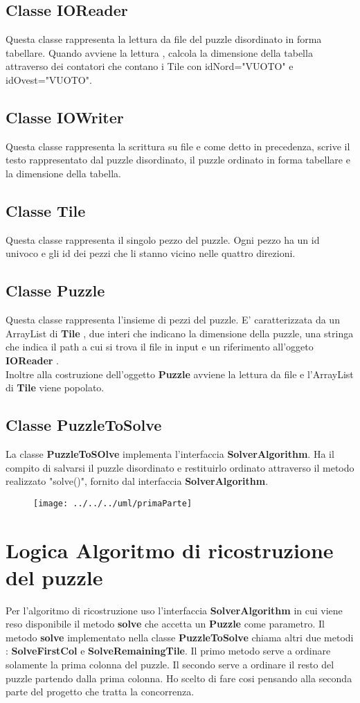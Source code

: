 \documentclass[11pt]{article}
\begin{document}
\subsection{Classe IOReader}
Questa classe rappresenta la lettura da file del puzzle disordinato in forma tabellare. Quando avviene la lettura , calcola la dimensione della tabella attraverso dei contatori che contano i Tile con idNord="VUOTO" e idOvest="VUOTO".
\subsection{Classe IOWriter}
Questa classe rappresenta la scrittura su file e come detto in precedenza, scrive il testo rappresentato dal puzzle disordinato, il puzzle ordinato in forma tabellare e la dimensione della tabella.
\subsection{Classe Tile}
Questa classe rappresenta il singolo pezzo del puzzle. Ogni pezzo ha un id univoco e gli id dei pezzi che li stanno vicino nelle quattro direzioni. 
\subsection{Classe Puzzle}
Questa classe rappresenta l'insieme di pezzi del puzzle. E' caratterizzata da un ArrayList di \textbf{Tile} , due interi che indicano la dimensione della puzzle, una stringa che indica il path a cui si trova il file in input e un riferimento all'oggeto \textbf{IOReader }.\\
Inoltre alla costruzione dell'oggetto \textbf{Puzzle} avviene la lettura da file e l'ArrayList di \textbf{Tile} viene popolato.
\subsection{Classe PuzzleToSolve}
La classe \textbf{PuzzleToSOlve} implementa l'interfaccia \textbf{SolverAlgorithm}. Ha il compito di salvarsi il puzzle disordinato e restituirlo ordinato attraverso il metodo realizzato "solve()", fornito dal interfaccia \textbf{SolverAlgorithm}. 
\begin{figure}[h]
\centering
\texttt{[image: ../../../uml/primaParte]}
\label{fig:primaParte}
\end{figure}
\newpage
\section{Logica Algoritmo di ricostruzione del puzzle}
Per l'algoritmo di ricostruzione uso l'interfaccia \textbf{SolverAlgorithm} in cui viene reso disponibile il metodo \textbf{solve} che accetta un \textbf{Puzzle} come parametro. Il metodo \textbf{solve} implementato nella classe \textbf{PuzzleToSolve} chiama altri due metodi : \textbf{SolveFirstCol} e \textbf{SolveRemainingTile}. Il primo metodo serve a ordinare solamente la prima colonna del puzzle. Il secondo serve a ordinare il resto del puzzle partendo dalla prima colonna. Ho scelto di fare cosi pensando alla seconda parte del progetto che tratta la concorrenza.
\end{document}
